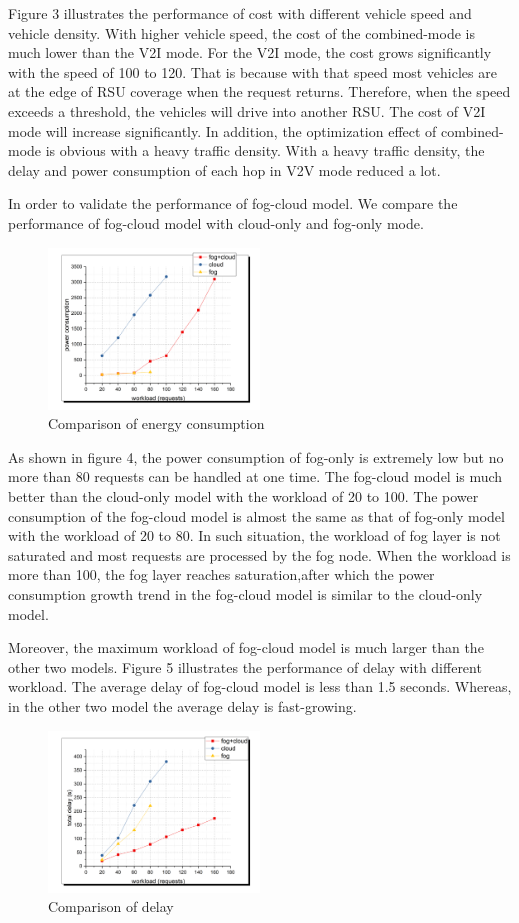 \documentclass[twoside,twocolumn]{article}
\begin{document}
Figure 3 illustrates the performance of cost with different vehicle speed and vehicle density. With higher vehicle speed, the cost of the combined-mode is much lower than the V2I mode. For the V2I mode, the cost grows significantly with the speed of 100 to 120. That is because with that speed most vehicles are at the edge of RSU coverage when the request returns. Therefore, when the speed exceeds a threshold, the vehicles will drive into another RSU. The cost of V2I mode will increase significantly. In addition, the optimization effect of combined-mode is obvious with a heavy traffic density. With a heavy traffic density, the delay and power consumption of each hop in V2V mode reduced a lot. 

In order to validate the performance of fog-cloud model. We compare the performance of fog-cloud model with cloud-only and fog-only mode. 
\begin{figure}[htp]
\includegraphics[width = 0.5\textwidth]{e.png}
\caption{Comparison of energy consumption}
\end{figure}

As shown in figure 4, the power consumption of fog-only is extremely low but no more than 80 requests can be handled at one time. The fog-cloud model is much better than the cloud-only model with the workload of 20 to 100. The power consumption of the fog-cloud model is almost the same as that of fog-only model with the workload of 20 to 80. In such situation, the workload of fog layer is not saturated and most requests are processed by the fog node. When the workload is more than 100, the fog layer reaches saturation,after which the power consumption growth trend in the fog-cloud model is similar to the cloud-only model.

Moreover, the maximum workload of fog-cloud model is much larger than the other two models. Figure 5 illustrates the performance of delay with different workload. The average delay of fog-cloud model is less than 1.5 seconds. Whereas, in the other two model the average delay is fast-growing. 
\begin{figure}[htbp]
\includegraphics[width = 0.5\textwidth]{f.png}
\caption{Comparison of delay}
\end{figure}
\end{document}

